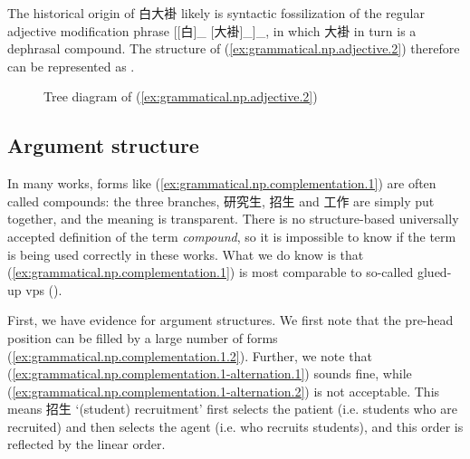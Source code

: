 \documentclass[UTF8, a4paper, oneside, scheme=plain, 12pt]{ctexrep}
\newcommand*{\term}[1]{\emph{#1}}
\newcommand{\translate}[1]{`#1'}
\begin{document}
The historical origin of 白大褂 likely is syntactic fossilization
of the regular adjective modification phrase [[白]_{} [大褂]_{}]_{},
in which 大褂 in turn is a dephrasal compound.
The structure of (\ref{ex:grammatical.np.adjective.2})
therefore can be represented as .

\begin{figure}[H]
    \centering
    {
        \centering
        
    }
    \caption{Tree diagram of (\ref{ex:grammatical.np.adjective.2})}
    \label{fig:grammatical.np.adjective.2}
\end{figure}

\subsection{Argument structure}\label{sec:grammatical.np.complementation}

In many works, forms like (\ref{ex:grammatical.np.complementation.1}) are often called compounds:
the three branches, 研究生, 招生 and 工作 are simply put together,
and the meaning is transparent.
There is no structure-based universally accepted definition of the term \term{compound},
so it is impossible to know if the term is being used correctly in these works.
What we do know is that (\ref{ex:grammatical.np.complementation.1})
is most comparable to so-called glued-up \acp{vp} ().

First, we have evidence for argument structures. 
We first note that the pre-head position can be filled by a large number of forms
(\ref{ex:grammatical.np.complementation.1.2}).
Further, we note that (\ref{ex:grammatical.np.complementation.1-alternation.1}) sounds fine,
while (\ref{ex:grammatical.np.complementation.1-alternation.2}) is not acceptable.
This means 招生 \translate{(student) recruitment} first selects the patient
(i.e. students who are recruited)
and then selects the agent (i.e. who recruits students),
and this order is reflected by the linear order.
\end{document}
